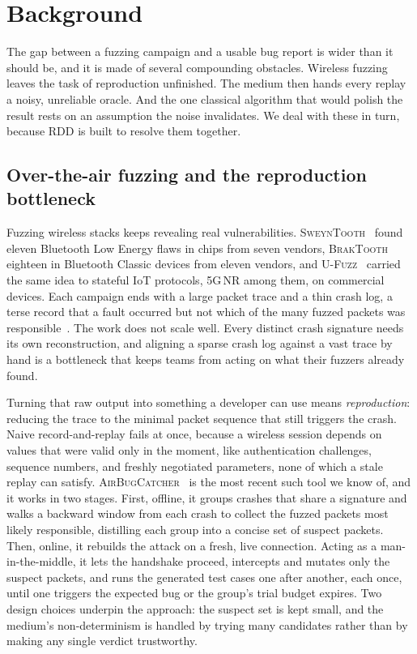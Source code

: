 \section{Background}\label{sec:background}

The gap between a fuzzing campaign and a usable bug report is wider than it should
be, and it is made of several compounding obstacles. Wireless fuzzing leaves the
task of reproduction unfinished. The medium then hands every replay a noisy,
unreliable oracle. And the one classical algorithm that would polish the result
rests on an assumption the noise invalidates. We deal with these in turn, because
RDD is built to resolve them together.

\subsection{Over-the-air fuzzing and the reproduction bottleneck}

Fuzzing wireless stacks keeps revealing real vulnerabilities.
\textsc{SweynTooth}~\cite{sweyntooth2020} found eleven Bluetooth Low Energy flaws
in chips from seven vendors, \textsc{BrakTooth}~\cite{braktooth2022} eighteen in
Bluetooth Classic devices from eleven vendors, and \textsc{U-Fuzz}~\cite{ufuzz2024} carried the same idea to stateful
IoT protocols, 5G\,NR among them, on commercial devices. Each campaign ends with a
large packet trace and a thin crash log, a terse record that a fault occurred but
not which of the many fuzzed packets was responsible~\cite{airbugcatcher2024}. The
work does not scale well. Every distinct crash signature needs its own
reconstruction, and aligning a sparse crash log against a vast trace by hand is a
bottleneck that keeps teams from acting on what their fuzzers already found.

Turning that raw output into something a developer can use means
\emph{reproduction}: reducing the trace to the minimal packet sequence that still
triggers the crash. Naive record-and-replay fails at once, because a wireless
session depends on values that were valid only in the moment, like authentication
challenges, sequence numbers, and freshly negotiated parameters, none of which a
stale replay can satisfy. \textsc{AirBugCatcher}~\cite{airbugcatcher2024} is the
most recent such tool we know of, and it works in two stages. First, offline, it groups crashes
that share a signature and walks a backward window from each crash to collect the
fuzzed packets most likely responsible, distilling each group into a concise set
of suspect packets. Then, online, it rebuilds the attack on a fresh, live
connection. Acting as a man-in-the-middle, it lets the handshake proceed,
intercepts and mutates only the suspect packets, and runs the generated test
cases one after another, each once, until one triggers the expected bug or the
group's trial budget expires. Two design choices underpin the approach: the
suspect set is kept small, and the medium's non-determinism is handled by trying
many candidates rather than by making any single verdict trustworthy.

